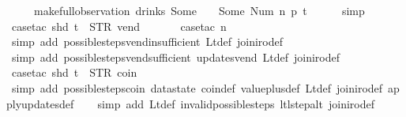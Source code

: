 \begin{isabellebody}
\ \ \ \ {\isacharparenright}{\isacharparenright}\ {\isacharparenleft}make{\isacharunderscore}full{\isacharunderscore}observation\ drinks\ {\isacharparenleft}Some\ {}{\isacharparenright}\ {\isacharless}{}\ {\isachardollar}{\isacharcolon}{\isacharequal}\ Some\ {\isacharparenleft}Num\ n{\isacharparenright}{\isachargreater}\ p\ t{\isacharparenright}{\isachardoublequoteclose}\isanewline
%
\isadelimproof
\ \ \ \ %
\endisadelimproof
%
\isatagproof
{}\isamarkupfalse%
\ simp\isanewline
\ \ \ \ \isamarkupfalse%
\ {\isacharparenleft}case{\isacharunderscore}tac\ {\isachardoublequoteopen}shd\ t\ {\isacharequal}\ {\isacharparenleft}STR\ {\isacharprime}{\isacharprime}vend{\isacharprime}{\isacharprime}{\isacharcomma}\ {\isacharbrackleft}{\isacharbrackright}{\isacharparenright}{\isachardoublequoteclose}{\isacharparenright}\isanewline
\ \ \ \ \isamarkupfalse%
\ {\isacharparenleft}case{\isacharunderscore}tac\ {\isachardoublequoteopen}n\ {\isacharequal}\ {}{\isachardoublequoteclose}{\isacharparenright}\isanewline
\ \ \ \ \ \ \isamarkupfalse%
\ {\isacharparenleft}simp\ add{\isacharcolon}\ possible{\isacharunderscore}steps{\isacharunderscore}vend{\isacharunderscore}insufficient\ Lt{\isacharunderscore}def\ join{\isacharunderscore}iro{\isacharunderscore}def{\isacharparenright}\isanewline
\ \ \ \ \ \isamarkupfalse%
\ {\isacharparenleft}simp\ add{\isacharcolon}\ possible{\isacharunderscore}steps{\isacharunderscore}vend{\isacharunderscore}sufficient\ updates{\isacharunderscore}vend\ Lt{\isacharunderscore}def\ join{\isacharunderscore}iro{\isacharunderscore}def{\isacharparenright}\isanewline
\ \ \ \ \isamarkupfalse%
\ {\isacharparenleft}case{\isacharunderscore}tac\ {\isachardoublequoteopen}shd\ t\ {\isacharequal}\ {\isacharparenleft}STR\ {\isacharprime}{\isacharprime}coin{\isacharprime}{\isacharprime}{\isacharcomma}\ {\isacharbrackleft}{\isacharbrackright}{\isacharparenright}{\isachardoublequoteclose}{\isacharparenright}\isanewline
\ \ \ \isamarkupfalse%
\ {\isacharparenleft}simp\ add{\isacharcolon}\ possible{\isacharunderscore}steps{\isacharunderscore}coin\ datastate\ coin{\isacharunderscore}def\ value{\isacharunderscore}plus{\isacharunderscore}def\ Lt{\isacharunderscore}def\ join{\isacharunderscore}iro{\isacharunderscore}def\ apply{\isacharunderscore}updates{\isacharunderscore}def{\isacharparenright}\isanewline
\ \ \isamarkupfalse%
\ {\isacharparenleft}simp\ add{\isacharcolon}\ Lt{\isacharunderscore}def\ invalid{\isacharunderscore}possible{\isacharunderscore}steps{\isacharunderscore}{}\ ltl{\isacharunderscore}step{\isacharunderscore}alt\ join{\isacharunderscore}iro{\isacharunderscore}def{\isacharparenright}%

\end{isabellebody}

